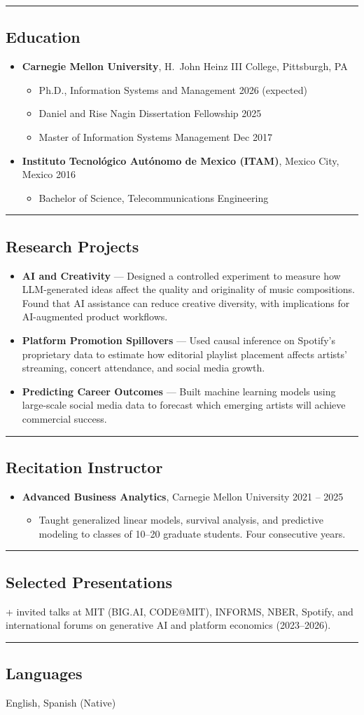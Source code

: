 \documentclass[10pt,letterpaper]{article}
\newcommand{\hsep}{\noindent\textcolor{gray}{\rule{\textwidth}{0.5pt}}}
\newcommand{\block}[1]{\begin{samepage}\hsep\subsection*{#1}\end{samepage}}
\begin{document}
\block{Education}

\begin{itemize}
\item \textbf{Carnegie Mellon University}, H.\ John Heinz III College, Pittsburgh, PA
  \begin{itemize}[label={}]
  \item Ph.D., Information Systems and Management \hfill 2026 (expected)
  \item Daniel and Rise Nagin Dissertation Fellowship \hfill 2025
  \item Master of Information Systems Management \hfill Dec 2017
  \end{itemize}
\item \textbf{Instituto Tecnol\'ogico Aut\'onomo de Mexico (ITAM)}, Mexico City, Mexico \hfill 2016
  \begin{itemize}[label={}]
  \item Bachelor of Science, Telecommunications Engineering
  \end{itemize}
\end{itemize}

\newpage

\block{Research Projects}

\begin{itemize}
\item \textbf{AI and Creativity} --- Designed a controlled experiment to measure how LLM-generated ideas affect the quality and originality of music compositions. Found that AI assistance can reduce creative diversity, with implications for AI-augmented product workflows.
\item \textbf{Platform Promotion Spillovers} --- Used causal inference on Spotify's proprietary data to estimate how editorial playlist placement affects artists' streaming, concert attendance, and social media growth.
\item \textbf{Predicting Career Outcomes} --- Built machine learning models using large-scale social media data to forecast which emerging artists will achieve commercial success.
\end{itemize}

\block{Recitation Instructor}

\begin{itemize}
\item \textbf{Advanced Business Analytics}, Carnegie Mellon University \hfill 2021 -- 2025
  \begin{itemize}[label={}]
  \item Taught generalized linear models, survival analysis, and predictive modeling to classes of 10--20 graduate students. Four consecutive years.
  \end{itemize}
\end{itemize}

\block{Selected Presentations}

+ invited talks at MIT (BIG.AI, CODE@MIT), INFORMS, NBER, Spotify, and international forums on generative AI and platform economics (2023--2026).

\block{Languages}

\noindent English, Spanish (Native)
\end{document}
